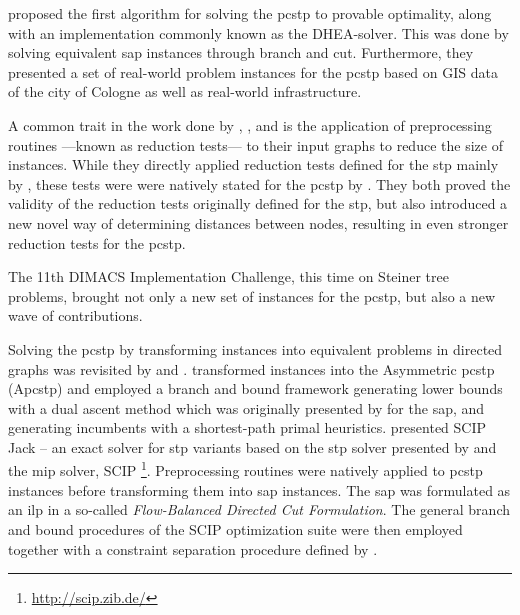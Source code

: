  \citet{ljubic2005solving} proposed the first algorithm for solving the \gls{pcstp} to provable optimality, along with an
 implementation commonly known as the DHEA-solver.
 This was done by solving
 equivalent \gls{sap} instances through branch and cut.
 Furthermore, they presented a set of real-world problem instances for the \gls{pcstp} based on GIS data of the
 city of Cologne as well as real-world infrastructure.

 A common trait in the work done by
 \citet{lucena2004strong}, \citet{Ljubic:2004:memetic}, and \citet{ljubic2005solving}
 is the application of preprocessing routines
  ---known as reduction tests--- to their input graphs to reduce the size of instances.
  While they directly applied reduction tests
  defined for the \gls{stp} mainly by \citet{duin1989edge,duin1989reduction},
  these tests were were natively stated for the \gls{pcstp}
  by \citet{uchoa2006reduction}.
  They both proved the validity
  of the reduction tests originally defined for the \gls{stp},
  but also introduced a new
  novel way of determining distances between nodes, resulting in
  even stronger reduction tests for the \gls{pcstp}.

  \medskip
  The 11th DIMACS Implementation Challenge\citep{DIMACS}, this time on Steiner tree problems,
  brought not only a new set of instances for the \gls{pcstp}, but
  also a new wave of contributions.

  Solving the \gls{pcstp} by transforming instances into equivalent problems in directed graphs
  was revisited by \citet{leitner2016dual} and \citet{gamrath2017scip}.
  \citet{leitner2016dual} transformed instances into the Asymmetric \gls{pcstp} (A\gls{pcstp})
  and employed a
  branch and bound framework generating lower bounds with a dual ascent method which was originally presented by \citet{wong1984dual} for the \gls{sap}, and
  generating incumbents with
  a shortest-path primal heuristics.
  \citet{gamrath2017scip} presented SCIP Jack -- an exact solver for \gls{stp} variants based on the \gls{stp} solver presented by
  \citet{koch1998solving} and the \gls{mip} solver, SCIP \footnote{\url{http://scip.zib.de/}}\citep{GleixnerEtal2017OO}.
  Preprocessing routines were natively applied to \gls{pcstp} instances before transforming them into \gls{sap} instances.
  The \gls{sap} was formulated as an
  \gls{ilp} in a so-called \textit{Flow-Balanced Directed Cut Formulation}. The general branch and bound
  procedures of the SCIP optimization suite were
  then employed together with a constraint separation procedure defined by \citet{koch1998solving}.

